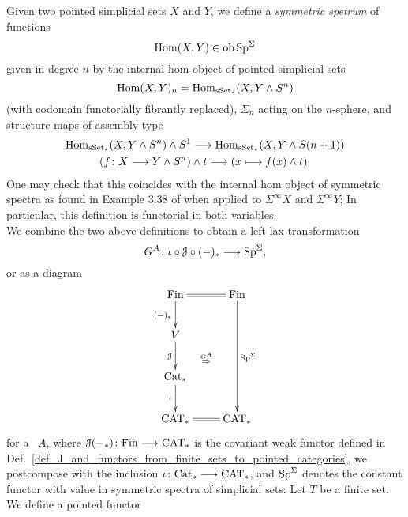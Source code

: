   \begin{defn}\label{def_left_lax_transform_G^A}
    Given two pointed simplicial sets $X$ and $Y$, we define a \emph{symmetric
    spetrum} of functions 
    \begin{displaymath}
      \operatorname{Hom}(X,Y) \in \operatorname{ob} \mathrm{Sp}^\Sigma
    \end{displaymath}
    given in degree $n$ by the internal hom-object of pointed simplicial sets
    \begin{displaymath}
      \operatorname{Hom}(X,Y)_n = \operatorname{Hom}_{\mathrm{sSet}_*}(X,Y \wedge S^n)
    \end{displaymath}
    (with codomain functorially fibrantly replaced), $\Sigma_n$ acting on the
    $n$-sphere, and structure maps of assembly type
    \begin{gather*}
    \operatorname{Hom}_{\mathrm{sSet}_*}(X,Y \wedge S^n) \wedge S^1 \longrightarrow \operatorname{Hom}_{\mathrm{sSet}_*}(X,Y \wedge S(n+1))\\
    (f \colon X \longrightarrow Y \wedge S^n) \wedge t \longmapsto (x \longmapsto f(x) \wedge t).
    \end{gather*}
    One may check that this coincides with the internal hom object of
    symmetric spectra as found in Example 3.38 of \cite{schwede2012symmetric}
    when applied to $\Sigma^\infty X$ and $\Sigma^\infty Y$; In particular,
    this definition is functorial in both variables.\\
    We combine the two above definitions to obtain a left lax transformation
    \begin{displaymath}
      G^A \colon \iota \circ \mathcal{J} \circ (-)_* \longrightarrow \mathrm{Sp}^\Sigma,
    \end{displaymath}
    or as a diagram
    \begin{displaymath}
      \xymatrix{
        \Fin \ar@{=}[r] \ar[d]_{(-)_*} \ar@{}[rddd]|{\overset{G^A}{\Rightarrow}} & \Fin \ar[ddd]^{\Sp^{\Sigma}} \\
        V \ar[d]_{\cJ} & \\
        \Cat_* \ar[d]_{\iota} & \\
        \CAT_* \ar@{=}[r] & \CAT_*
      }
    \end{displaymath}
    for a \hring~$A$, where $\mathcal{J}(-_*) \colon \mathrm{Fin} \longrightarrow \mathrm{CAT}_*$ is the covariant
    weak functor defined in
    Def.~\ref{def_J_and_functors_from_finite_sets_to_pointed_categories}, we
    postcompose with the inclusion $\iota \colon \mathrm{Cat}_* \longrightarrow \mathrm{CAT}_*$, and
    $\mathrm{Sp}^\Sigma$ denotes the constant functor with value in symmetric spectra of
    simplicial sets: Let $T$ be a finite set. We define a pointed functor
    \begin{gather*}

\end{gather*}
\end{defn}
